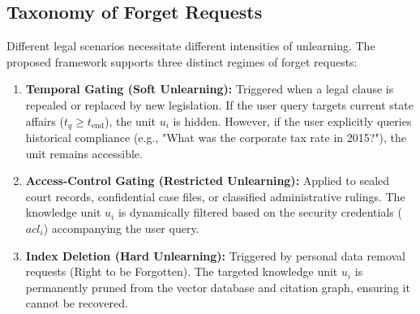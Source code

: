 \subsection{Taxonomy of Forget Requests}
Different legal scenarios necessitate different intensities of unlearning. The proposed framework supports three distinct regimes of forget requests:
\begin{enumerate}
    \item \textbf{Temporal Gating (Soft Unlearning):} Triggered when a legal clause is repealed or replaced by new legislation. If the user query targets current state affairs ($t_q \ge t_{\text{end}}$), the unit $u_i$ is hidden. However, if the user explicitly queries historical compliance (e.g., "What was the corporate tax rate in 2015?"), the unit remains accessible.
    \item \textbf{Access-Control Gating (Restricted Unlearning):} Applied to sealed court records, confidential case files, or classified administrative rulings. The knowledge unit $u_i$ is dynamically filtered based on the security credentials ($acl_i$) accompanying the user query.
    \item \textbf{Index Deletion (Hard Unlearning):} Triggered by personal data removal requests (Right to be Forgotten). The targeted knowledge unit $u_i$ is permanently pruned from the vector database and citation graph, ensuring it cannot be recovered.
\end{enumerate}

